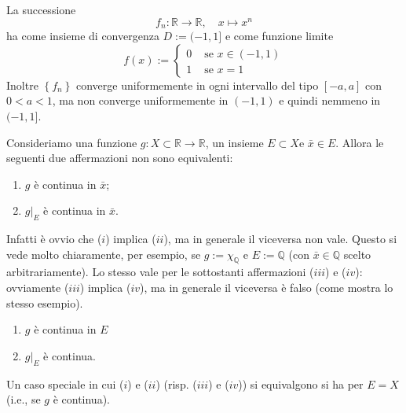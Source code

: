 \begin{ex}\label{ex: 4.2}
    La successione
    \[f_{n}: \mathbb{R} \rightarrow \mathbb{R}, \quad x \mapsto x^{n}\]
    ha come insieme di convergenza $D:=(-1,1]$ e come funzione limite
    \[f(x):= \begin{cases}0 & \text { se } x \in(-1,1) \\ 1 & \text { se } x=1\end{cases}\]
    Inoltre $\left\{f_{n}\right\}$ converge uniformemente in ogni intervallo del tipo $[-a, a]$ con $0<a<1$, ma non converge uniformemente in $(-1,1)$ e quindi nemmeno in $(-1,1]$.
\end{ex}
\begin{oss}
    
    Consideriamo una funzione $g: X \subset \mathbb{R} \rightarrow \mathbb{R}$, un insieme $E \subset X \mathrm{e}$ $\bar{x} \in E$. Allora le seguenti due affermazioni non sono equivalenti:
    \begin{enumerate}[i]
        \item $g$ è continua in $\bar{x}$;
        \item $\left.g\right|_{E}$ è continua in $\bar{x}$.
    \end{enumerate}
    Infatti è ovvio che ($i$) implica ($ii$), ma in generale il viceversa non vale. Questo si vede molto chiaramente, per esempio, se $g:=\chi_{\mathbb{Q}}$ e $E:=\mathbb{Q}$ (con $\bar{x} \in \mathbb{Q}$ scelto arbitrariamente). Lo stesso vale per le sottostanti affermazioni ($iii$) e ($iv$): ovviamente ($iii$) implica ($iv$), ma in generale il viceversa è falso (come mostra lo stesso esempio).
    \begin{enumerate}[i, resume]
        \item $g$ è continua in $E$
        \item $\left.g\right|_{E}$ è continua.
    \end{enumerate}
    Un caso speciale in cui ($i$) e ($ii$) (risp. ($iii$) e ($iv$)) si equivalgono si ha per $E=X$ (i.e., se $g$ è continua).
\end{oss}

